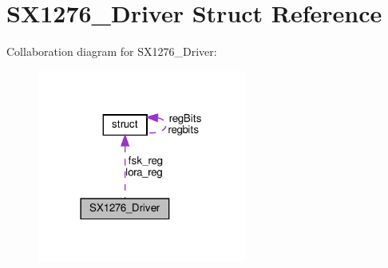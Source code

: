 \hypertarget{structSX1276__Driver}{}\section{S\+X1276\+\_\+\+Driver Struct Reference}
\label{structSX1276__Driver}


Collaboration diagram for S\+X1276\+\_\+\+Driver\+:\nopagebreak
\begin{figure}[H]
\begin{center}
\leavevmode
\includegraphics[width=194pt]{structSX1276__Driver__coll__graph}
\end{center}
\end{figure}
